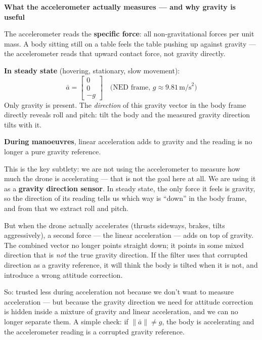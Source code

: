 \documentclass[12pt, a4paper]{article}
\begin{document}
\begin{notebox}
  \textbf{What the accelerometer actually measures --- and why gravity is
  useful}

  The accelerometer reads the \textbf{specific force}: all non-gravitational
  forces per unit mass.
  A body sitting still on a table feels the table pushing up against
  gravity --- the accelerometer reads that upward contact force, not
  gravity directly.

  \textbf{In steady state} (hovering, stationary, slow movement):
  \[
    \bar{a} = \begin{bmatrix} 0 \\ 0 \\ -g \end{bmatrix}
    \quad \text{(NED frame, } g \approx 9.81\,\text{m/s}^2\text{)}
  \]
  Only gravity is present.
  The \emph{direction} of this gravity vector in the body frame directly
  reveals roll and pitch: tilt the body and the measured gravity direction
  tilts with it.

  \textbf{During manoeuvres}, linear acceleration adds to gravity and the
  reading is no longer a pure gravity reference.

  This is the key subtlety: we are not using the accelerometer to measure
  how much the drone is accelerating --- that is not the goal here at all.
  We are using it as a \textbf{gravity direction sensor}.
  In steady state, the only force it feels is gravity, so the direction of
  its reading tells us which way is ``down'' in the body frame, and from
  that we extract roll and pitch.

  But when the drone actually accelerates (thrusts sideways, brakes, tilts
  aggressively), a second force --- the linear acceleration --- adds on top
  of gravity.
  The combined vector no longer points straight down; it points in some
  mixed direction that is \emph{not} the true gravity direction.
  If the filter uses that corrupted direction as a gravity reference, it
  will think the body is tilted when it is not, and introduce a wrong
  attitude correction.

  So: trusted less during acceleration not because we don't want to
  measure acceleration --- but because the gravity direction we need
  for attitude correction is hidden inside a mixture of gravity and
  linear acceleration, and we can no longer separate them.
  A simple check: if $\|\bar{a}\| \neq g$, the body is accelerating and
  the accelerometer reading is a corrupted gravity reference.
\end{notebox}
\end{document}
